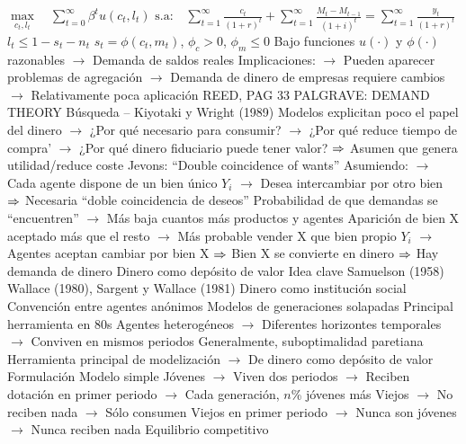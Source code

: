 \documentclass{nuevotema}
\begin{document}
\begin{esquemal}
				\4[] $\underset{c_t, l_t}{\max} \quad \sum_{t=0}^\infty \beta^t u(c_t,l_t)$
				\4[] $\text{s.a:} \quad \sum_{t=1}^\infty \frac{c_t}{(1+r)^t} + \sum_{t=1}^\infty \frac{M_t-M_{t-1}}{(1+i)^t} = \sum_{t=1}^\infty \frac{y_t}{(1+r)^t}$
				\4[] \quad \quad \quad $l_t \leq 1 - s_t - n_t$
				\4[] \quad \quad \quad $s_t = \phi(c_t, m_t)$, \quad $\phi_c > 0$, $\phi_m \leq 0$
				\4[] Bajo funciones $u(\cdot)$ y $\phi(\cdot)$ razonables
				\4[] $\to$ Demanda de saldos reales 
				\4[] Implicaciones:
				\4[] $\to$ Pueden aparecer problemas de agregación
				\4[] $\to$ Demanda de dinero de empresas requiere cambios
				\4[] $\to$ Relativamente poca aplicación
				\4[] REED, PAG 33 PALGRAVE: DEMAND THEORY
			\3 Búsqueda -- Kiyotaki y Wright (1989)
				\4[] Modelos explicitan poco el papel del dinero
				\4[] $\to$ ¿Por qué necesario para consumir?
				\4[] $\to$ ¿Por qué reduce tiempo de compra'
				\4[] $\to$ ¿Por qué dinero fiduciario puede tener valor?
				\4[] $\Rightarrow$ Asumen que genera utilidad/reduce coste
				\4[] Jevons: ``Double coincidence of wants''
				\4[] Asumiendo:
				\4[] $\to$ Cada agente dispone de un bien único $Y_i$
				\4[] $\to$ Desea intercambiar por otro bien
				\4[] $\Rightarrow$ Necesaria ``doble coincidencia de deseos''
				\4[] Probabilidad de que demandas se ``encuentren''
				\4[] $\to$ Más baja cuantos más productos y agentes
				\4[] Aparición de bien X aceptado más que el resto
				\4[] $\to$ Más probable vender X que bien propio $Y_i$
				\4[] $\to$ Agentes aceptan cambiar por bien X
				\4[] $\Rightarrow$ Bien X se convierte en dinero
				\4[] $\Rightarrow$ Hay demanda de dinero
		\2[III] Dinero como depósito de valor
			\3 Idea clave
				\4 Samuelson (1958)
				\4 Wallace (1980), Sargent y Wallace (1981)
				\4 Dinero como institución social
				\4[] Convención entre agentes anónimos
				\4 Modelos de generaciones solapadas
				\4[] Principal herramienta en 80s
				\4[] Agentes heterogéneos
				\4[] $\to$ Diferentes horizontes temporales
				\4[] $\to$ Conviven en mismos periodos
				\4[] Generalmente, suboptimalidad paretiana
				\4[] Herramienta principal de modelización
				\4[] $\to$ De dinero como depósito de valor
			\3 Formulación
				\4 Modelo simple
				\4[] Jóvenes
				\4[] $\to$ Viven dos periodos
				\4[] $\to$ Reciben dotación en primer periodo
				\4[] $\to$ Cada generación, $n$\% jóvenes más
				\4[] Viejos
				\4[] $\to$ No reciben nada
				\4[] $\to$ Sólo consumen
				\4[] Viejos en primer periodo
				\4[] $\to$ Nunca son jóvenes
				\4[] $\to$ Nunca reciben nada
				\4[] Equilibrio competitivo

\end{esquemal}
\end{document}
